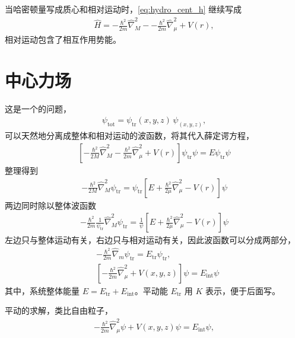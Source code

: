 当哈密顿量写成质心和相对运动时，\eqref{eq:hydro_cent_h} 继续写成
\begin{align}
    \hat H = -\frac{\hbar^2}{2m} \hat \nabla_M^2 -
    -\frac{\hbar^2}{2m} \hat \nabla_\mu^2 + V(r),
\end{align}
相对运动包含了相互作用势能。


\section{中心力场}
这是一个的问题，
\begin{align}
    \psi_{\mathrm{tot}} = \psi_{\mathrm{tr}}(x,y,z) \,\psi_(x,y,z),
\end{align}
可以天然地分离成整体和相对运动的波函数，将其代入薛定谔方程，
\begin{align}
    \left[
        -\frac{\hbar^2}{2M}\hat\nabla_M^2 - \frac{\hbar^2}{2m} \hat\nabla_\mu^2 + V(r) 
    \right] \psi_{\mathrm{tr}} \psi = E \psi_{\mathrm{tr}} \psi
\end{align}
整理得到
\begin{align}
    - \frac{\hbar^2}{2M}\hat\nabla_M^2 \psi_{\mathrm{tr}} = \psi_{\mathrm{tr}} \left[
        E + \frac{\hbar^2}{2\mu}\hat\nabla_\mu^2 - V(r)
    \right]\psi
\end{align}
两边同时除以整体波函数
\begin{align}
    -\frac{\hbar^2}{2m} \frac1{\psi_{\mathrm{tr}}} \hat\nabla_M^2 \psi_{\mathrm{tr}} = \frac1{\psi} \left[
        E + \frac{\hbar^2}{2\mu}\hat\nabla_\mu^2 - V(r)
    \right]\psi
\end{align}
左边只与整体运动有关，右边只与相对运动有关，因此波函数可以分成两部分，
\begin{align}
    & - \frac{\hbar^2}{2m} \hat \nabla_m \psi_{\mathrm{tr}} = E_\mathrm{tr} \psi_{\mathrm{tr}}, 
    \label{eq:hydro_Htr}
    \\
    & \left[-\frac{\hbar^2}{2m} \hat\nabla_\mu^2 + V(x,y,z)\right] \psi = E_\mathrm{int} \psi
    \label{eq:hydro_Hint}
\end{align}
其中，系统整体能量 $E = E_{\mathrm{tr}} + E_{\mathrm{int}}$。平动能 $E_{\mathrm{tr}}$ 用 $K$ 表示，便于后面写。

平动的求解，类比自由粒子，
\begin{align}
    -\frac{\hbar^2}{2m} \hat\nabla_\mu^2 \psi + V(x,y,z) \psi = E_\mathrm{int} \psi, 
\end{align}


